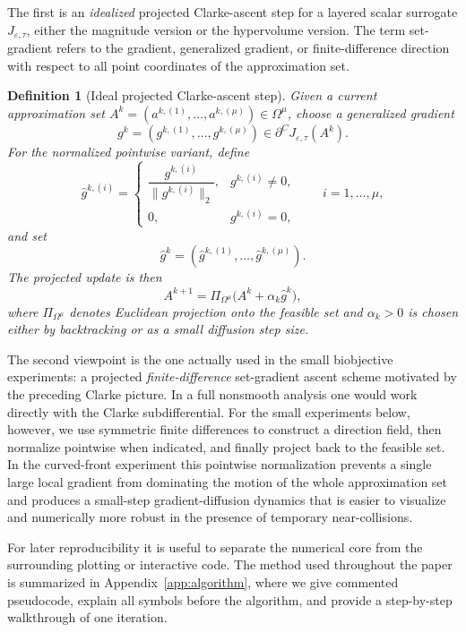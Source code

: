 \documentclass{article}
\newtheorem{definition}{Definition}
\newcommand{\clarke}{\partial^{\!C}}
\begin{document}
The first is an \emph{idealized} projected Clarke-ascent step for a layered scalar surrogate $J_{\varepsilon,\tau}$, either the magnitude version or the hypervolume version.  The term set-gradient refers to the gradient, generalized gradient, or finite-difference direction with respect to all point coordinates of the approximation set.

\begin{definition}[Ideal projected Clarke-ascent step]
Given a current approximation set $A^k=(a^{k,(1)},\dots,a^{k,(\mu)})\in\Omega^\mu$, choose a generalized gradient
\[
g^k=(g^{k,(1)},\dots,g^{k,(\mu)})\in \clarke J_{\varepsilon,\tau}(A^k).
\]
For the normalized pointwise variant, define
\[
\widehat g^{k,(i)}=
\begin{cases}
\dfrac{g^{k,(i)}}{\|g^{k,(i)}\|_2}, & g^{k,(i)}\neq 0,\\[1ex]
0, & g^{k,(i)}=0,
\end{cases}
\qquad i=1,\dots,\mu,
\]
and set
\[
\widehat g^k=(\widehat g^{k,(1)},\dots,\widehat g^{k,(\mu)}).
\]
The projected update is then
\[
A^{k+1}=\Pi_{\Omega^\mu}\bigl(A^k+\alpha_k \widehat g^k\bigr),
\]
where $\Pi_{\Omega^\mu}$ denotes Euclidean projection onto the feasible set and $\alpha_k>0$ is chosen either by backtracking or as a small diffusion step size.
\end{definition}

The second viewpoint is the one actually used in the small biobjective experiments: a projected \emph{finite-difference} set-gradient ascent scheme motivated by the preceding Clarke picture. In a full nonsmooth analysis one would work directly with the Clarke subdifferential. For the small experiments below, however, we use symmetric finite differences to construct a direction field, then normalize pointwise when indicated, and finally project back to the feasible set. In the curved-front experiment this pointwise normalization prevents a single large local gradient from dominating the motion of the whole approximation set and produces a small-step gradient-diffusion dynamics that is easier to visualize and numerically more robust in the presence of temporary near-collisions.

For later reproducibility it is useful to separate the numerical core from the surrounding plotting or interactive code. The method used throughout the paper is summarized in Appendix~\ref{app:algorithm}, where we give commented pseudocode, explain all symbols before the algorithm, and provide a step-by-step walkthrough of one iteration.
\end{document}

